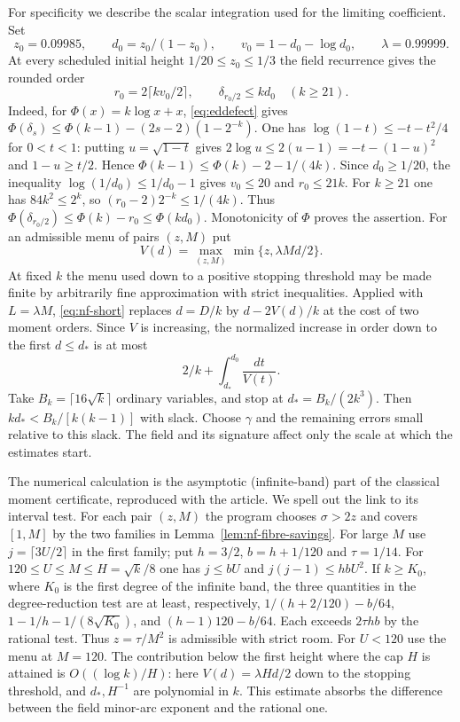 \documentclass[11pt,letterpaper]{article}
\theoremstyle{definition}
\numberwithin{equation}{section}
\begin{document}
For specificity we describe the scalar integration used for the
limiting coefficient. Set
\[
 z_0=0.09985,\qquad d_0=z_0/(1-z_0),\qquad
 v_0=1-d_0-\log d_0,\qquad \lambda=0.99999 .
\]
At every scheduled initial height $1/20\le z_0\le1/3$ the field
recurrence gives the rounded order
\[
          r_0=2\lceil kv_0/2\rceil,\qquad \delta_{r_0/2}\le kd_0
                    \quad(k\ge21).
\]
Indeed, for $\Phi(x)=k\log x+x$, \eqref{eq:eddefect} gives
$\Phi(\delta_s)\le\Phi(k-1)-(2s-2)(1-2^{-k})$.
One has $\log(1-t)\le-t-t^2/4$ for $0<t<1$: putting
$u=\sqrt{1-t}$ gives $2\log u\le2(u-1)=-t-(1-u)^2$ and
$1-u\ge t/2$. Hence $\Phi(k-1)\le\Phi(k)-2-1/(4k)$.
Since $d_0\ge1/20$, the inequality $\log(1/d_0)\le1/d_0-1$
gives $v_0\le20$ and $r_0\le21k$. For $k\ge21$ one has
$84k^2\le2^k$, so $(r_0-2)2^{-k}\le1/(4k)$.
Thus $\Phi(\delta_{r_0/2})\le\Phi(k)-r_0\le\Phi(kd_0)$.
Monotonicity of $\Phi$ proves the assertion.
For an admissible menu of pairs $(z,M)$ put
\[
 V(d)=\max_{(z,M)}\min\{z,\lambda Md/2\}.
\]
At fixed $k$ the menu used down to a positive stopping threshold
may be made finite by arbitrarily fine approximation with strict
inequalities. Applied with $L=\lambda M$, \eqref{eq:nf-short}
replaces $d=D/k$ by $d-2V(d)/k$ at the cost of two moment orders.
Since $V$ is increasing, the normalized increase in order down to
the first $d\le d_*$ is at most
\[
 2/k+\int_{d_*}^{d_0}\frac{dt}{V(t)}.
\]
Take $B_k=\lceil16\sqrt{k}\rceil$ ordinary variables, and stop
at $d_*=B_k/(2k^3)$. Then $kd_* < B_k/[k(k-1)]$ with slack.
Choose $\gamma$ and the remaining errors small relative to this
slack. The field and its signature affect only the scale at which
the estimates start.

The numerical calculation is the asymptotic (infinite-band) part
of the classical moment certificate, reproduced with the article.
We spell out the link to its interval test. For each pair $(z,M)$
the program chooses $\sigma>2z$ and covers $[1,M]$ by the two
families in Lemma~\ref{lem:nf-fibre-savings}. For large $M$ use
$j=\lceil3U/2\rceil$ in the first family; put $h=3/2$, $b=h+1/120$ and $\tau=1/14$. For $120\le U\le M\le
H=\sqrt{k}/8$ one has $j\le bU$ and $j(j-1)\le hbU^2$. If $k\ge K_0$,
where $K_0$ is the first degree of the infinite band, the three
quantities in the degree-reduction test are at least, respectively,
$1/(h+2/120)-b/64$, $1-1/h-1/(8\sqrt{K_0})$, and
$(h-1)120-b/64$. Each exceeds $2\tau hb$ by the rational
test. Thus $z=\tau/M^2$ is admissible with strict room.
For $U<120$ use the menu at $M=120$. The contribution below the first
height where the cap $H$ is attained is
$O((\log k)/H)$: here $V(d)=\lambda H d/2$ down to the stopping
threshold, and $d_*,H^{-1}$ are polynomial in $k$. This estimate
absorbs the difference between the field minor-arc exponent and the
rational one.
\end{document}
